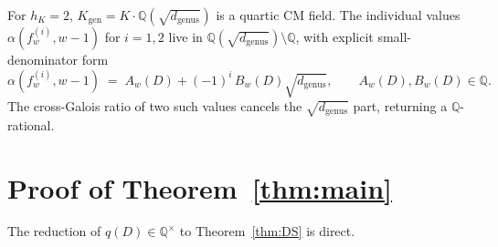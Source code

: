 \documentclass[11pt,a4paper]{amsart}
\theoremstyle{plain}
\theoremstyle{definition}
\newcommand{\Q}{\mathbb{Q}}
\newcommand{\Kgen}{K_{\mathrm{gen}}}
\begin{document}
For $h_K = 2$, $\Kgen = K \cdot \Q(\sqrt{d_{\mathrm{genus}}})$ is a
quartic CM field. The individual values
$\alpha(f_w^{(i)}, w-1)$ for $i = 1, 2$ live in
$\Q(\sqrt{d_{\mathrm{genus}}}) \setminus \Q$, with explicit small-denominator
form
\[
  \alpha(f_w^{(i)}, w-1) \;=\; A_w(D) + (-1)^i \, B_w(D) \sqrt{d_{\mathrm{genus}}},
  \qquad A_w(D), B_w(D) \in \Q.
\]
The cross-Galois ratio of two such values cancels the
$\sqrt{d_{\mathrm{genus}}}$ part, returning a $\Q$-rational.

\section{Proof of Theorem~\ref{thm:main}}\label{sec:proof}

The reduction of $q(D) \in \Q^\times$ to Theorem~\ref{thm:DS} is direct.
\end{document}
